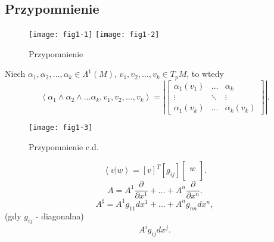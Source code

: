 \documentclass[../main.tex]{subfiles}
\begin{document}
    \subsection{Przypomnienie}
    \begin{figure}[h]
        \texttt{[image: fig1-1]}
        \texttt{[image: fig1-2]}
        \caption{Przypomnienie}
        \label{fig:fig1-1}
    \end{figure}
    Niech $\alpha_1, \alpha_2, \ldots, \alpha_k \in \Lambda^1(M)$, $v_1, v_2, \ldots, v_k \in T_pM$, to wtedy
    \[
        \left<\alpha_1\land \alpha_2\land \ldots\alpha_k, v_1, v_2, \ldots, v_k \right> = \left| \begin{bmatrix} \alpha_1(v_1) & \ldots & \alpha_k\\ \vdots & \ddots & \vdots\\ \alpha_1(v_k) & \ldots & \alpha_k(v_k) \end{bmatrix} \right|
    .\]
    \begin{figure}[h]
        \centering
        \texttt{[image: fig1-3]}
        \caption{Przypomnienie c.d.}
        \label{fig:fig1-3}
    \end{figure}
    \[
        \left< v | w \right> = [v]^T [g_{ij}] \begin{bmatrix} \\w \\ \\ \end{bmatrix}
    .\]
\[
    A = A^1 \frac{\partial }{\partial x^1} + \ldots + A^n \frac{\partial }{\partial x^n}
.\]
\[
A^\sharp = A^1g_{11}dx^1 + \ldots + A^ng_{nn}dx^n
,\]
(gdy $g_{ij}$ - diagonalna)
\[
    A^ig_{ij}dx^j
.\]
\end{document}
